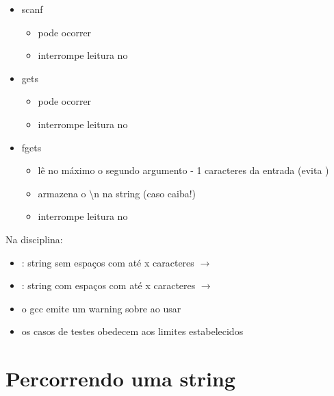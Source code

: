 \documentclass[portuguese,10pt,xcolor=table]{bredelebeamer}
\begin{document}
		\begin{frame} 
				
			\begin{itemize}
				\item scanf
					\begin{itemize}
						\item pode ocorrer 
						\item interrompe leitura no 
					\end{itemize}
				\item gets
					\begin{itemize}
						\item pode ocorrer 
						\item interrompe leitura no 
					\end{itemize}
				\item fgets
					\begin{itemize}
						\item lê no máximo o segundo argumento - 1 caracteres da entrada (evita )
						\item armazena o \textbackslash n na string (caso caiba!)
						\item interrompe leitura no 
					\end{itemize}
			\end{itemize}
		\end{frame}

		\begin{frame} 
			Na disciplina:
			\begin{itemize}
				\item {}: string sem espaços com até x caracteres $\rightarrow$ \textdf{scanf}
				\item {}: string com espaços com até x caracteres $\rightarrow$ \textdf{gets}
				\item o gcc emite um warning sobre  ao usar \textdf{gets}
				\item os casos de testes obedecem aos limites estabelecidos
			\end{itemize}
		\end{frame}



	\section{Percorrendo uma string}
		\begin{frame}[c]
			\begin{center}
				\structure{\large \insertsection}
			\end{center}
		\end{frame} 
\end{document}
